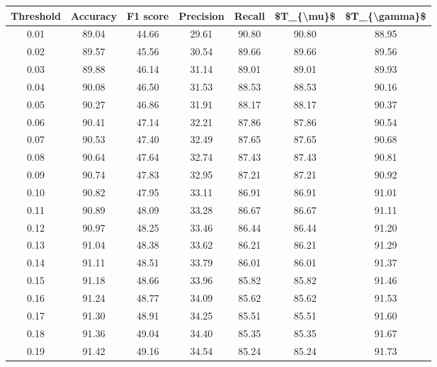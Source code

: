 \begin{tabular}{|c|c|c|c|c|c|c|}
\hline
 Threshold &  Accuracy &  F1 score &  Precision &  Recall &  \$T\_\{\textbackslash mu\}\$ &  \$T\_\{\textbackslash gamma\}\$ \\
\hline
      0.01 &     89.04 &     44.66 &      29.61 &   90.80 &      90.80 &         88.95 \\
      0.02 &     89.57 &     45.56 &      30.54 &   89.66 &      89.66 &         89.56 \\
      0.03 &     89.88 &     46.14 &      31.14 &   89.01 &      89.01 &         89.93 \\
      0.04 &     90.08 &     46.50 &      31.53 &   88.53 &      88.53 &         90.16 \\
      0.05 &     90.27 &     46.86 &      31.91 &   88.17 &      88.17 &         90.37 \\
      0.06 &     90.41 &     47.14 &      32.21 &   87.86 &      87.86 &         90.54 \\
      0.07 &     90.53 &     47.40 &      32.49 &   87.65 &      87.65 &         90.68 \\
      0.08 &     90.64 &     47.64 &      32.74 &   87.43 &      87.43 &         90.81 \\
      0.09 &     90.74 &     47.83 &      32.95 &   87.21 &      87.21 &         90.92 \\
      0.10 &     90.82 &     47.95 &      33.11 &   86.91 &      86.91 &         91.01 \\
      0.11 &     90.89 &     48.09 &      33.28 &   86.67 &      86.67 &         91.11 \\
      0.12 &     90.97 &     48.25 &      33.46 &   86.44 &      86.44 &         91.20 \\
      0.13 &     91.04 &     48.38 &      33.62 &   86.21 &      86.21 &         91.29 \\
      0.14 &     91.11 &     48.51 &      33.79 &   86.01 &      86.01 &         91.37 \\
      0.15 &     91.18 &     48.66 &      33.96 &   85.82 &      85.82 &         91.46 \\
      0.16 &     91.24 &     48.77 &      34.09 &   85.62 &      85.62 &         91.53 \\
      0.17 &     91.30 &     48.91 &      34.25 &   85.51 &      85.51 &         91.60 \\
      0.18 &     91.36 &     49.04 &      34.40 &   85.35 &      85.35 &         91.67 \\
      0.19 &     91.42 &     49.16 &      34.54 &   85.24 &      85.24 &         91.73 \\

\end{tabular}
